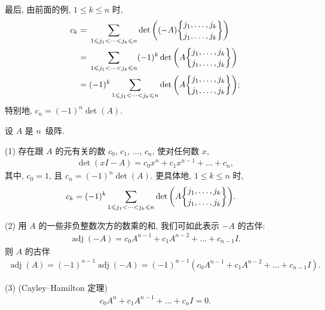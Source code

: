 \documentclass[../libro.tex]{subfiles}
\begin{document}
\begin{example}
    最后, 由前面的例,
    \(1 \leq k \leq n\) 时,
    \begin{align*}
        c_k
        = {} &
        \sum_{1 \leq j_1 < \dots < j_k \leq n}
        \det {\left(
                (-A) \submat{j_1,\dots,j_k}{j_1,\dots,j_k}
        \right)}
        \\
        = {} &
        \sum_{1 \leq j_1 < \dots < j_k \leq n}
        (-1)^k
        \det {\left(
                A \submat{j_1,\dots,j_k}{j_1,\dots,j_k}
        \right)}
        \\
        = {} &
        (-1)^k
        \sum_{1 \leq j_1 < \dots < j_k \leq n}
        \det {\left(
                A \submat{j_1,\dots,j_k}{j_1,\dots,j_k}
        \right)};
    \end{align*}
    特别地, \(c_n = (-1)^n \det {(A)}\).
\end{example}


\begin{theorem}
    设 \(A\) 是 \(n\)~级阵.

    (1)
    存在跟 \(A\) 的元有关的数
    \(c_0\), \(c_1\), \(\dots\), \(c_n\),
    使对任何数 \(x\),
    \begin{align*}
        \det {(xI - A)} = c_0 x^n + c_1 x^{n-1} + \dots + c_n,
    \end{align*}
    其中, \(c_0 = 1\),
    且 \(c_n = (-1)^n \det {(A)}\).
    更具体地,
    \(1 \leq k \leq n\) 时,
    \begin{align*}
        c_k
        = {} &
        (-1)^k
        \sum_{1 \leq j_1 < \dots < j_k \leq n}
        \det {\left(
                A \submat{j_1,\dots,j_k}{j_1,\dots,j_k}
        \right)}.
    \end{align*}

    (2)
    用 \(A\) 的一些非负整数次方的数乘的和,
    我们可如此表示 \(-A\) 的古伴:
    \begin{align*}
        \operatorname{adj} {(-A)}
        = c_0 A^{n-1} + c_1 A^{n-2} + \dots + c_{n-1} I.
    \end{align*}
    则 \(A\) 的古伴
    \begin{align*}
        \operatorname{adj} {(A)}
        = (-1)^{n-1} \operatorname{adj} {(-A)}
        = (-1)^{n-1} (c_0 A^{n-1} + c_1 A^{n-2} + \dots + c_{n-1} I).
    \end{align*}

    (3)
    (Cayley--Hamilton 定理)
    \begin{align*}
        c_0 A^{n} + c_1 A^{n-1} + \dots + c_{n} I = 0.
    \end{align*}
\end{theorem}
\end{document}
